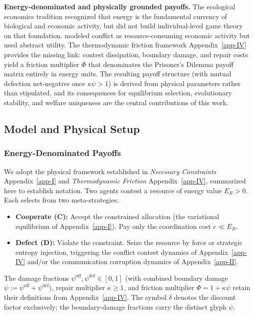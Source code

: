 \documentclass[11pt]{article}
\theoremstyle{plain}
\theoremstyle{definition}
\theoremstyle{remark}
\let\origsubsection\subsection
\renewcommand{\subsection}{\needspace{7\baselineskip}\origsubsection}
\let\origsubsubsection\subsubsection
\renewcommand{\subsubsection}{\needspace{4\baselineskip}\origsubsubsection}
\providecommand{\tightlist}{%
  \setlength{\itemsep}{0pt}\setlength{\parskip}{0pt}}
\begin{document}
\textbf{Energy-denominated and physically grounded payoffs.} The
ecological economics tradition \citep{Lotka1922, GeorgescuRoegen1971}
recognized that energy is the fundamental currency of biological and
economic activity, but did not build individual-level game theory on
that foundation. \citet{Hirshleifer1991} modeled conflict as
resource-consuming economic activity but used abstract utility. The
thermodynamic friction framework Appendix~\ref{app-IV} provides the
missing link: contest dissipation, boundary damage, and repair costs
yield a friction multiplier \(\Phi\) that denominates the Prisoner's
Dilemma payoff matrix entirely in energy units. The resulting payoff
structure (with mutual defection net-negative once \(\kappa\psi > 1\))
is derived from physical parameters rather than stipulated, and its
consequences for equilibrium selection, evolutionary stability, and
welfare uniqueness are the central contributions of this work.

\subsection{Model and Physical Setup}\label{model-and-physical-setup}

\subsubsection{Energy-Denominated
Payoffs}\label{energy-denominated-payoffs}

We adopt the physical framework established in \emph{Necessary
Constraints} Appendix~\ref{app-I} and \emph{Thermodynamic Friction}
Appendix~\ref{app-IV}, summarized here to establish notation. Two agents
contest a resource of energy value \(E_R > 0\). Each selects from two
meta-strategies:

\begin{itemize}
\tightlist
\item
  \textbf{Cooperate (C):} Accept the constrained allocation (the
  variational equilibrium of Appendix~\ref{app-I}). Pay only the
  coordination cost \(c \ll E_R\).
\item
  \textbf{Defect (D):} Violate the constraint. Seize the resource by
  force or strategic entropy injection, triggering the conflict contest
  dynamics of Appendix~\ref{app-IV} and/or the communication corruption
  dynamics of Appendix~\ref{app-II}.
\end{itemize}

The damage fractions \(\psi^{\text{off}}, \psi^{\text{def}} \in [0,1]\)
(with combined boundary damage
\(\psi := \psi^{\text{off}} + \psi^{\text{def}}\)), repair multiplier
\(\kappa \geq 1\), and friction multiplier \(\Phi = 1 + \kappa\psi\)
retain their definitions from Appendix~\ref{app-IV}. The symbol
\(\delta\) denotes the discount factor exclusively; the boundary-damage
fractions carry the distinct glyph \(\psi\).
\end{document}
